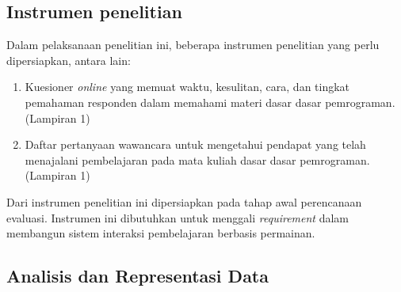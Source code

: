 	\subsection{Instrumen penelitian}
	
	Dalam pelaksanaan penelitian ini, beberapa instrumen penelitian yang perlu dipersiapkan, antara lain:
	
	\begin{enumerate}
		\item Kuesioner \textit{online} yang memuat waktu, kesulitan, cara, dan tingkat pemahaman responden dalam memahami materi dasar dasar pemrograman. (Lampiran 1)
		\item Daftar pertanyaan wawancara untuk mengetahui pendapat yang telah menajalani pembelajaran pada mata kuliah dasar dasar pemrograman. (Lampiran 1)
	\end{enumerate}

	Dari instrumen penelitian ini dipersiapkan pada tahap awal perencanaan evaluasi. Instrumen ini dibutuhkan untuk menggali \textit{requirement} dalam membangun sistem interaksi pembelajaran berbasis permainan.
	
	\subsection{Analisis dan Representasi Data}
	
